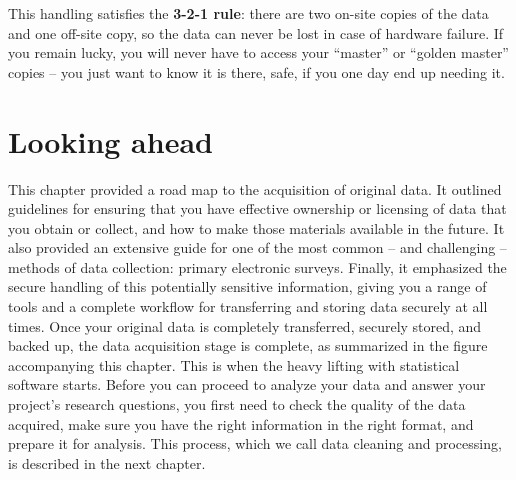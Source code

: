 \noindent This handling satisfies the \textbf{3-2-1 rule}:
there are two on-site copies of the data and one off-site copy,
so the data can never be lost in case of hardware failure.
If you remain lucky, you will never have to access your ``master'' or ``golden master'' copies --
you just want to know it is there, safe, if you one day end up needing it.

\section{Looking ahead}

This chapter provided a road map to the acquisition of original data.
It outlined guidelines for ensuring that you have effective ownership
or licensing of data that you obtain or collect,
and how to make those materials available in the future.
It also provided an extensive guide for one of the most common --
and challenging --
methods of data collection: primary electronic surveys.
Finally, it emphasized the secure handling of this potentially sensitive information,
giving you a range of tools and a complete workflow
for transferring and storing data securely at all times.
Once your original data is completely transferred, securely stored, and backed up,
the data acquisition stage is complete, as
summarized in the figure accompanying this chapter.
This is when the heavy lifting with statistical software starts.
Before you can proceed to analyze your data 
and answer your project's research questions,
you first need to check the quality of the data acquired,
make sure you have the right information in the right format, and prepare it for analysis.
This process, which we call data cleaning and processing,
is described in the next chapter.

